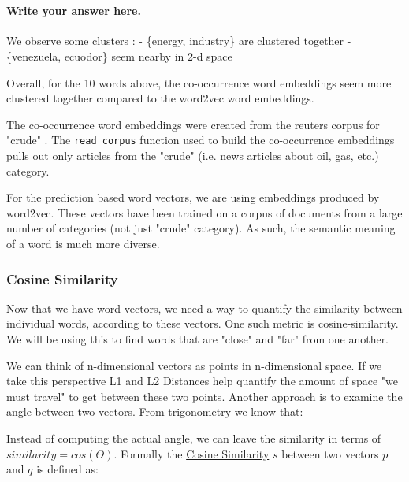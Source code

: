 \documentclass[11pt]{article}
\begin{document}
    \begin{center}
    \end{center}
    { \hspace*{\fill} \\}
    
    \paragraph{Write your answer here.}\label{write-your-answer-here.}

We observe some clusters : - \{energy, industry\} are clustered together
- \{venezuela, ecuodor\} seem nearby in 2-d space

Overall, for the 10 words above, the co-occurrence word embeddings seem
more clustered together compared to the word2vec word embeddings.

The co-occurrence word embeddings were created from the reuters corpus
for "crude" . The \texttt{read\_corpus} function used to build the
co-occurrence embeddings pulls out only articles from the "crude" (i.e.
news articles about oil, gas, etc.) category.

For the prediction based word vectors, we are using embeddings produced
by word2vec. These vectors have been trained on a corpus of documents
from a large number of categories (not just "crude" category). As such,
the semantic meaning of a word is much more diverse.

    \subsubsection{Cosine Similarity}\label{cosine-similarity}

Now that we have word vectors, we need a way to quantify the similarity
between individual words, according to these vectors. One such metric is
cosine-similarity. We will be using this to find words that are "close"
and "far" from one another.

We can think of n-dimensional vectors as points in n-dimensional space.
If we take this perspective L1 and L2 Distances help quantify the amount
of space "we must travel" to get between these two points. Another
approach is to examine the angle between two vectors. From trigonometry
we know that:

Instead of computing the actual angle, we can leave the similarity in
terms of \(similarity = cos(\Theta)\). Formally the
\href{https://en.wikipedia.org/wiki/Cosine_similarity}{Cosine
Similarity} \(s\) between two vectors \(p\) and \(q\) is defined as:
\end{document}
